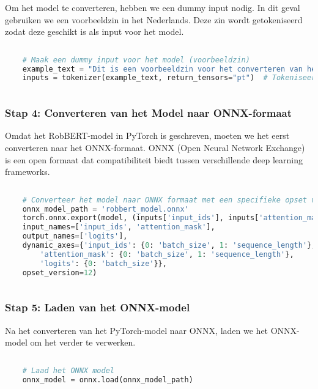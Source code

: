 Om het model te converteren, hebben we een dummy input nodig. In dit geval gebruiken we een voorbeeldzin in het Nederlands. Deze zin wordt getokeniseerd zodat deze geschikt is als input voor het model.

\begin{lstlisting}[language=Python, caption={Voorbereiden van een voorbeeldzin voor tokenisatie.}]
    
    # Maak een dummy input voor het model (voorbeeldzin)
    example_text = "Dit is een voorbeeldzin voor het converteren van het model."
    inputs = tokenizer(example_text, return_tensors="pt")  # Tokeniseer de invoertekst
    
\end{lstlisting}

\subsubsection{Stap 4: Converteren van het Model naar ONNX-formaat}

Omdat het RobBERT-model in PyTorch is geschreven, moeten we het eerst converteren naar het ONNX-formaat. ONNX (Open Neural Network Exchange) is een open formaat dat compatibiliteit biedt tussen verschillende deep learning frameworks.

\begin{lstlisting}[language=Python, caption={Converteren van het RobBERT-model naar ONNX-formaat.}]
    
    # Converteer het model naar ONNX formaat met een specifieke opset versie (bijv. 12)
    onnx_model_path = 'robbert_model.onnx'
    torch.onnx.export(model, (inputs['input_ids'], inputs['attention_mask']), onnx_model_path,
    input_names=['input_ids', 'attention_mask'],
    output_names=['logits'],
    dynamic_axes={'input_ids': {0: 'batch_size', 1: 'sequence_length'},
        'attention_mask': {0: 'batch_size', 1: 'sequence_length'},
        'logits': {0: 'batch_size'}},
    opset_version=12)
    
\end{lstlisting}

\subsubsection{Stap 5: Laden van het ONNX-model}

Na het converteren van het PyTorch-model naar ONNX, laden we het ONNX-model om het verder te verwerken.

\begin{lstlisting}[language=Python, caption={Laden van het geconverteerde ONNX-model.}]
    
    # Laad het ONNX model
    onnx_model = onnx.load(onnx_model_path)
    
\end{lstlisting}

